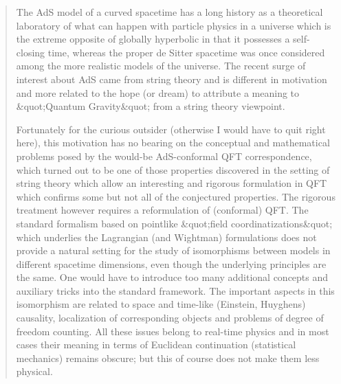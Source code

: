 \begin{quote}
      The AdS model of a curved spacetime has a long history as a
      theoretical laboratory of what can happen with particle physics
      in a universe which is the extreme opposite of globally hyperbolic
      in that it possesses a self-closing time, whereas the proper 
      de Sitter spacetime was once considered among the more realistic
      models of the universe.  The recent surge of interest about AdS
      came from string theory and is different in motivation and more 
      related to the hope (or dream) to attribute a meaning to &quot;Quantum
      Gravity&quot; from a string theory viewpoint.

      Fortunately for the curious outsider (otherwise I would have to
      quit right here), this motivation has no bearing on the conceptual
      and mathematical problems posed by the would-be AdS-conformal QFT
      correspondence, which turned out to be one of those properties 
      discovered in the setting of string theory which allow an interesting
      and rigorous formulation in QFT which confirms some but not all of
      the conjectured properties.  The rigorous treatment however requires
      a reformulation of (conformal) QFT.  The standard formalism based
      on pointlike &quot;field coordinatizations&quot; which underlies the    
      Lagrangian
      (and Wightman) formulations does not provide a natural setting for 
      the study of isomorphisms between models in different spacetime 
      dimensions, even though the underlying principles are the same.  
      One would have to introduce too many additional concepts and 
      auxiliary tricks into the standard framework.  The important 
      aspects in this isomorphism are related to space and time-like 
      (Einstein, Huyghens) causality, localization of corresponding 
      objects and problems of degree of freedom counting.  All these 
      issues belong to real-time physics and in most cases their meaning
      in terms of Euclidean continuation (statistical mechanics) remains
      obscure; but this of course does not make them less physical.


\end{quote}
